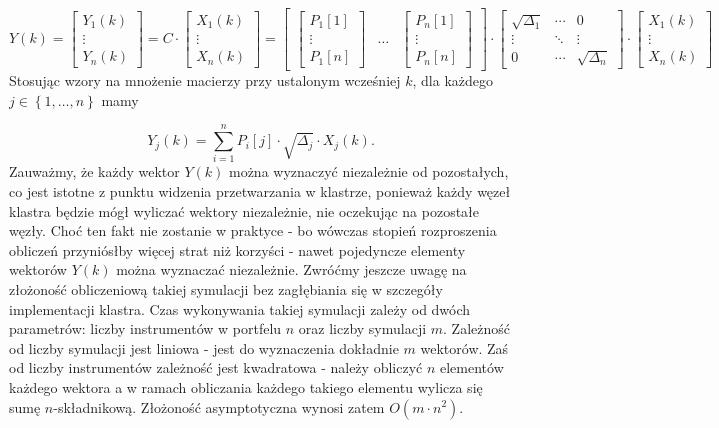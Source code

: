 \documentclass[11pt,titlepage]{article}
\numberwithin{equation}{section}
\begin{document}
\begin{equation} \label{eq:ynk}
Y(k)=
    \begin{bmatrix}
 Y_1(k) \\ 
\vdots \\
Y_n(k)
\end{bmatrix} =
C \cdot \begin{bmatrix}
 X_1(k) \\ 
\vdots \\
X_n(k)
\end{bmatrix} =
    \begin{bmatrix}
    \begin{bmatrix}P_1[1] \\ \vdots \\ P_1[n]\end{bmatrix} &
    \hdots &
    \begin{bmatrix}P_n[1] \\ \vdots \\ P_n[n]\end{bmatrix} 
\end{bmatrix}
    \cdot
\begin{bmatrix} \sqrt{\Delta_1} &  \cdots &0 \\
\vdots & \ddots  & \vdots \\ 0& \cdots & \sqrt{\Delta_n} \end{bmatrix}
    \cdot 
\begin{bmatrix}
 X_1(k) \\ 
\vdots \\
X_n(k)
\end{bmatrix}
\end{equation}
 Stosując wzory na mnożenie macierzy przy ustalonym wcześniej $k$, dla każdego $j \in \left \{1, \hdots, n \right \} $ mamy
 
 
 \begin{equation}
     Y_j(k)=\sum_{i=1}^{n}P_i[j] \cdot \sqrt{\Delta_j}\cdot X_j(k).
 \end{equation}
Zauważmy, że każdy wektor $Y(k)$ można wyznaczyć niezależnie od pozostałych, co jest istotne z punktu widzenia przetwarzania w klastrze, ponieważ każdy węzeł klastra będzie mógł wyliczać wektory niezależnie, nie oczekując na pozostałe węzły. Choć ten fakt nie zostanie w praktyce - bo wówczas stopień rozproszenia obliczeń przyniósłby więcej strat niż korzyści - nawet pojedyncze elementy wektorów $Y(k)$ można wyznaczać niezależnie.
Zwróćmy jeszcze uwagę na złożoność obliczeniową takiej symulacji bez zagłębiania się w szczegóły implementacji klastra. Czas wykonywania takiej symulacji zależy od dwóch parametrów: liczby instrumentów w portfelu $n$ oraz liczby symulacji $m$. Zależność od liczby symulacji jest liniowa - jest do wyznaczenia dokładnie $m$ wektorów. Zaś od liczby instrumentów zależność jest kwadratowa - należy obliczyć $n$ elementów każdego wektora a w ramach obliczania każdego takiego elementu wylicza się sumę $n$-składnikową. Złożoność asymptotyczna wynosi zatem $O(m \cdot n^2)$.
\end{document}
